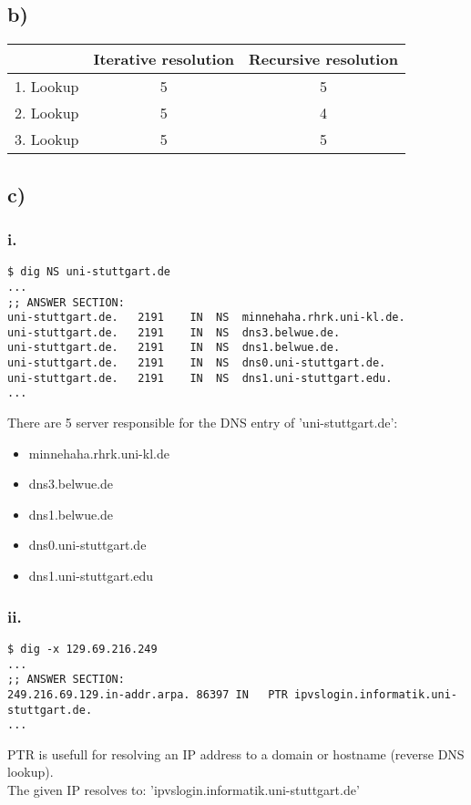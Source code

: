 \documentclass{scrartcl}
\begin{document}
\subsection*{b)}
\begin{table}[!ht]
	\centering
	\begin{tabular}{|c|c|c|}
		\hline
		& Iterative resolution & Recursive resolution \\ \hline
		1. Lookup & 5 & 5 \\ \hline
		2. Lookup & 5 & 4 \\ \hline
		3. Lookup & 5 & 5 \\ \hline
	\end{tabular}
\end{table}
\subsection*{c)}

\lstset{basicstyle=\ttfamily\footnotesize,breaklines=true}
\subsubsection*{i.}
\begin{lstlisting}
$ dig NS uni-stuttgart.de
...
;; ANSWER SECTION:
uni-stuttgart.de.	2191	IN	NS	minnehaha.rhrk.uni-kl.de.
uni-stuttgart.de.	2191	IN	NS	dns3.belwue.de.
uni-stuttgart.de.	2191	IN	NS	dns1.belwue.de.
uni-stuttgart.de.	2191	IN	NS	dns0.uni-stuttgart.de.
uni-stuttgart.de.	2191	IN	NS	dns1.uni-stuttgart.edu.
...
\end{lstlisting}
There are 5 server responsible for the DNS entry of 'uni-stuttgart.de':
\begin{itemize}
	\item minnehaha.rhrk.uni-kl.de
	\item dns3.belwue.de
	\item dns1.belwue.de
	\item dns0.uni-stuttgart.de
	\item dns1.uni-stuttgart.edu
\end{itemize}
\subsubsection*{ii.}
\begin{lstlisting}
$ dig -x 129.69.216.249
...
;; ANSWER SECTION:
249.216.69.129.in-addr.arpa. 86397 IN	PTR	ipvslogin.informatik.uni-stuttgart.de.
...
\end{lstlisting}
PTR is usefull for resolving an IP address to a domain or hostname (reverse DNS lookup).\\
The given IP resolves to: 'ipvslogin.informatik.uni-stuttgart.de'
\end{document}
